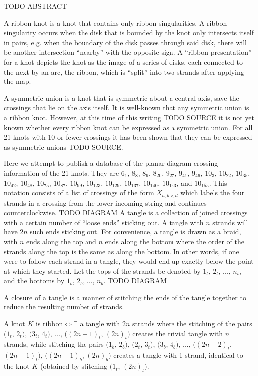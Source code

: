 

\begin{paperabstract}
TODO ABSTRACT
\end{paperabstract}
\begin{paper}
\theorems
{}
A ribbon knot is a knot that contains only ribbon singularities.
A ribbon singularity occurs when the disk that is bounded by the knot only
intersects itself in pairs, e.g. when the boundary of the disk passes through
said disk, there will be another intersection ``nearby'' with the opposite sign.
A ``ribbon presentation'' for a knot depicts the knot as the image of a series
of disks, each connected to the next by an arc, the ribbon, which is ``split''
into two strands after applying the map.

A symmetric union is a knot that is symmetric about a central axis, save the
crossings that lie on the axis itself.
It is well-known that any symmetric union is a ribbon knot.
However, at this time of this writing TODO SOURCE it is not yet known whether
every ribbon knot can be expressed as a symmetric union.
For all 21 knots with 10 or fewer crossings it has been shown that they can be
expressed as symmetric unions TODO SOURCE.

Here we attempt to publish a database of the planar diagram crossing information
of the 21 knots.
They are $6_1$, $8_8$, $8_9$, $8_{20}$, $9_{27}$, $9_{41}$, $9_{46}$, $10_3$,
$10_{22}$, $10_{35}$, $10_{42}$, $10_{48}$, $10_{75}$, $10_{87}$, $10_{99}$,
$10_{123}$, $10_{129}$, $10_{137}$, $10_{140}$, $10_{153}$, and $10_{155}$.
This notation consists of a list of crossings of the form $X_{a,b,c,d}$ which
labels the four strands in a crossing from the lower incoming string and
continues counterclockwise.
TODO DIAGRAM
A tangle is a collection of joined crossings with a certain number of ``loose
ends'' sticking out.
A tangle with $n$ strands will have $2n$ such ends sticking out.
For convenience, a tangle is drawn as a braid, with $n$ ends along the top and
$n$ ends along the bottom where the order of the strands along the top is the
same as along the bottom.
In other words, if one were to follow each strand in a tangle, they would end up
exactly below the point at which they started.
Let the tops of the strands be denoted by $1_t$, $2_t$, ..., $n_t$, and the
bottoms  by $1_b$, $2_b$, ..., $n_b$.
TODO DIAGRAM

A closure of a tangle is a manner of stitching the ends of the tangle together
to reduce the resulting number of strands.
\begin{theorem}
A knot $K$ is ribbon$\iff\exists$ a tangle with $2n$ strands where the stitching
of the pairs $(1_t$, $2_t)$, $(3_t$, $4_t)$, ..., $((2n-1)_t$, $(2n)_t)$ creates
the trivial tangle with $n$ strands, while stitching the pairs $(1_b$, $2_b)$,
$(2_t$, $3_t)$, $(3_b$, $4_b)$, ..., $((2n-2)_t$, $(2n-1)_t)$, $((2n-1)_b$,
$(2n)_b)$ creates a tangle with 1 strand, identical to the knot $K$ (obtained by
stitching $(1_t$, $(2n)_t)$.
\end{theorem}
\end{paper}

